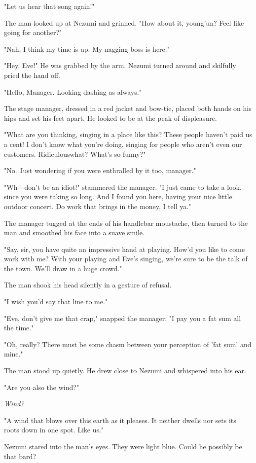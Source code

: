 "Let us hear that song again!"

The man looked up at Nezumi and grinned. "How about it, young'un? Feel
like going for another?"

"Nah, I think my time is up. My nagging boss is here."

"Hey, Eve!" He was grabbed by the arm. Nezumi turned around and
skilfully pried the hand off.

"Hello, Manager. Looking dashing as always."

The stage manager, dressed in a red jacket and bow-tie, placed both
hands on his hips and set his feet apart. He looked to be at the peak of
displeasure.

"What are you thinking, singing in a place like this? These people
haven't paid us a cent! I don't know what you're doing, singing for
people who aren't even our customers. Ridiculous\el what? What's so
funny?"

"No. Just wondering if you were enthralled by it too, manager."

"Wh---don't be an idiot!" stammered the manager. "I just came to take a
look, since you were taking so long. And I found you here, having your
nice little outdoor concert. Do work that brings in the money, I tell
ya."

The manager tugged at the ends of his handlebar moustache, then turned
to the man and smoothed his face into a suave smile.

"Say, sir, you have quite an impressive hand at playing. How'd you like
to come work with me? With your playing and Eve's singing, we're sure to
be the talk of the town. We'll draw in a huge crowd."

The man shook his head silently in a gesture of refusal.

"I wish you'd say that line to me."

"Eve, don't give me that crap," snapped the manager. "I pay you a fat
sum all the time."

"Oh, really? There must be some chasm between your perception of 'fat
sum' and mine."

The man stood up quietly. He drew close to Nezumi and whispered into his
ear.

"Are you also the wind?"

\emph{Wind?}

"A wind that blows over this earth as it pleases. It neither dwells nor
sets its roots down in one spot. Like us."

Nezumi stared into the man's eyes. They were light blue. Could he
possibly be that bard?


